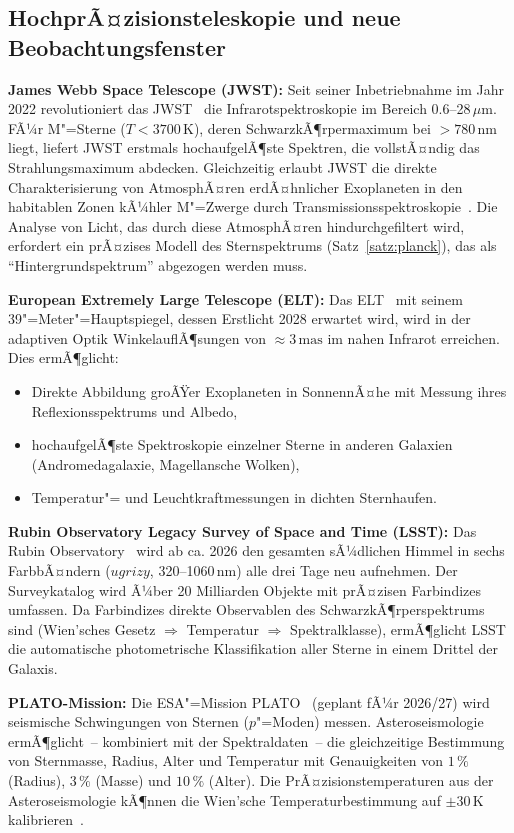 ﻿\documentclass[a4paper,12pt]{article}
\theoremstyle{definition}
\begin{document}
\subsection{HochprÃ¤zisionsteleskopie und neue Beobachtungsfenster}

\textbf{James Webb Space Telescope (JWST):}
Seit seiner Inbetriebnahme im Jahr 2022 revolutioniert das
JWST~\cite{gardner2006} die Infrarotspektroskopie im Bereich 0.6--28\,$\mu$m.
FÃ¼r M"=Sterne ($T < 3700\,\text{K}$), deren SchwarzkÃ¶rpermaximum
bei $> 780\,\text{nm}$ liegt, liefert JWST erstmals hochaufgelÃ¶ste
Spektren, die vollstÃ¤ndig das Strahlungsmaximum abdecken.
Gleichzeitig erlaubt JWST die direkte Charakterisierung von AtmosphÃ¤ren
erdÃ¤hnlicher Exoplaneten in den habitablen Zonen kÃ¼hler M"=Zwerge
durch Transmissionsspektroskopie~\cite{lustigyaeger2022}.
Die Analyse von Licht, das durch diese AtmosphÃ¤ren hindurchgefiltert wird,
erfordert ein prÃ¤zises Modell des Sternspektrums (Satz~\ref{satz:planck}),
das als ``Hintergrundspektrum'' abgezogen werden muss.

\textbf{European Extremely Large Telescope (ELT):}
Das ELT~\cite{gilmozzi2007} mit seinem 39"=Meter"=Hauptspiegel, dessen
Erstlicht 2028 erwartet wird, wird in der adaptiven Optik WinkelauflÃ¶sungen
von $\approx 3\,\text{mas}$ im nahen Infrarot erreichen. Dies ermÃ¶glicht:
\begin{itemize}
    \item Direkte Abbildung groÃŸer Exoplaneten in SonnennÃ¤he mit Messung
          ihres Reflexionsspektrums und Albedo,
    \item hochaufgelÃ¶ste Spektroskopie einzelner Sterne in anderen Galaxien
          (Andromedagalaxie, Magellansche Wolken),
    \item Temperatur"= und Leuchtkraftmessungen in dichten Sternhaufen.
\end{itemize}

\textbf{Rubin Observatory Legacy Survey of Space and Time (LSST):}
Das Rubin Observatory~\cite{ivezic2019} wird ab ca. 2026 den gesamten
sÃ¼dlichen Himmel in sechs FarbbÃ¤ndern ($ugrizy$, 320--1060\,nm) alle
drei Tage neu aufnehmen. Der Surveykatalog wird Ã¼ber 20 Milliarden Objekte
mit prÃ¤zisen Farbindizes umfassen. Da Farbindizes direkte Observablen
des SchwarzkÃ¶rperspektrums sind (Wien'sches Gesetz $\Rightarrow$
Temperatur $\Rightarrow$ Spektralklasse), ermÃ¶glicht LSST die automatische
photometrische Klassifikation aller Sterne in einem Drittel der Galaxis.

\textbf{PLATO-Mission:}
Die ESA"=Mission PLATO~\cite{rauer2014} (geplant fÃ¼r 2026/27) wird
seismische Schwingungen von Sternen ($p$"=Moden) messen.
Asteroseismologie ermÃ¶glicht~-- kombiniert mit der Spektraldaten~-- die
gleichzeitige Bestimmung von Sternmasse, Radius, Alter und Temperatur
mit Genauigkeiten von $1\,\%$ (Radius), $3\,\%$ (Masse) und
$10\,\%$ (Alter). Die PrÃ¤zisionstemperaturen aus der Asteroseismologie
kÃ¶nnen die Wien'sche Temperaturbestimmung auf $\pm 30\,\text{K}$
kalibrieren~\cite{chaplin2013}.
\end{document}
